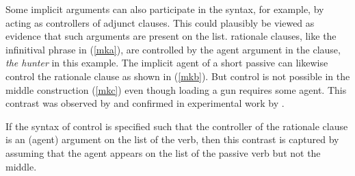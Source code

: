 \documentclass[output=paper
 	        ,biblatex
                ,babelshorthands
                ,newtxmath
                ,draftmode
                ,colorlinks, citecolor=brown
]{langscibook}
\begin{document}
Some implicit arguments can also participate in the syntax, for example, by acting as controllers of
adjunct clauses.  This could plausibly be viewed as evidence that such arguments are present on the
\argst list.   rationale clauses, like the infinitival phrase in
(\ref{mka}), are controlled by the agent argument in the clause, \textit{the
  hunter} in this example.  The implicit agent of a short passive can likewise control
the rationale clause as shown in (\ref{mkb}).  But control is not possible in the middle
construction (\ref{mkc}) even though loading a gun requires some agent.  This contrast was observed
by \citet{KeyserandRoeper1984} and confirmed in experimental work by \citet{MaunerandKoenig2000}.

\begin{exe}
\ex\label{mk}
\begin{xlist}
\end{xlist}
\end{exe}



\noindent
If the syntax of control  is specified such that the controller of the rationale clause is an (agent) argument on the \argst list of the verb, then this contrast is captured by assuming that the agent appears on the \argst list of the passive verb but not the middle.
\end{document}
